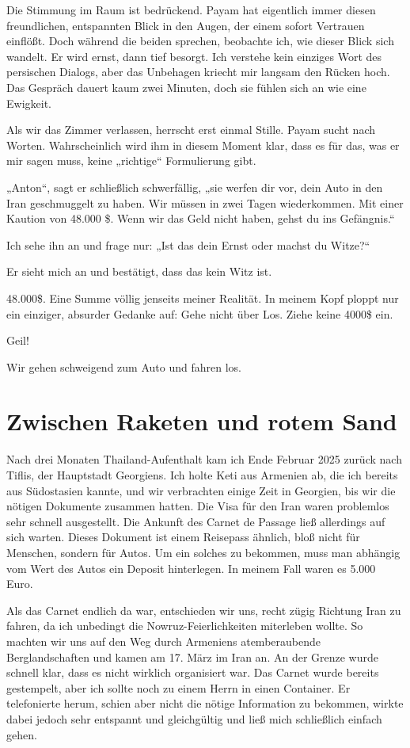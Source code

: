 Die Stimmung im Raum ist bedrückend. Payam hat eigentlich immer diesen freundlichen, entspannten Blick in den Augen, der einem sofort Vertrauen einflößt. Doch während die beiden sprechen, beobachte ich, wie dieser Blick sich wandelt. Er wird ernst, dann tief besorgt. Ich verstehe kein einziges Wort des persischen Dialogs, aber das Unbehagen kriecht mir langsam den Rücken hoch. Das Gespräch dauert kaum zwei Minuten, doch sie fühlen sich an wie eine Ewigkeit.

Als wir das Zimmer verlassen, herrscht erst einmal Stille. Payam sucht nach Worten. Wahrscheinlich wird ihm in diesem Moment klar, dass es für das, was er mir sagen muss, keine „richtige“ Formulierung gibt.

„Anton“, sagt er schließlich schwerfällig, „sie werfen dir vor, dein Auto in den Iran geschmuggelt zu haben. Wir müssen in zwei Tagen wiederkommen. Mit einer Kaution von 48.000 \$. Wenn wir das Geld nicht haben, gehst du ins Gefängnis.“

Ich sehe ihn an und frage nur: „Ist das dein Ernst oder machst du Witze?“

Er sieht mich an und bestätigt, dass das kein Witz ist.

48.000\$. Eine Summe völlig jenseits meiner Realität. In meinem Kopf ploppt nur ein einziger, absurder Gedanke auf: Gehe nicht über Los. Ziehe keine 4000\$ ein.

Geil!

Wir gehen schweigend zum Auto und fahren los.

\chapter*{Zwischen Raketen und rotem Sand}

Nach drei Monaten Thailand-Aufenthalt kam ich Ende Februar 2025 zurück nach Tiflis, der Hauptstadt Georgiens. Ich holte Keti aus Armenien ab, die ich bereits aus Südostasien kannte, und wir verbrachten einige Zeit in Georgien, bis wir die nötigen Dokumente zusammen hatten. Die Visa für den Iran waren problemlos sehr schnell ausgestellt. Die Ankunft des Carnet de Passage ließ allerdings auf sich warten. Dieses Dokument ist einem Reisepass ähnlich, bloß nicht für Menschen, sondern für Autos. Um ein solches zu bekommen, muss man abhängig vom Wert des Autos ein Deposit hinterlegen. In meinem Fall waren es 5.000 Euro.

Als das Carnet endlich da war, entschieden wir uns, recht zügig Richtung Iran zu fahren, da ich unbedingt die Nowruz-Feierlichkeiten miterleben wollte. So machten wir uns auf den Weg durch Armeniens atemberaubende Berglandschaften und kamen am 17. März im Iran an. An der Grenze wurde schnell klar, dass es nicht wirklich organisiert war. Das Carnet wurde bereits gestempelt, aber ich sollte noch zu einem Herrn in einen Container. Er telefonierte herum, schien aber nicht die nötige Information zu bekommen, wirkte dabei jedoch sehr entspannt und gleichgültig und ließ mich schließlich einfach gehen.

